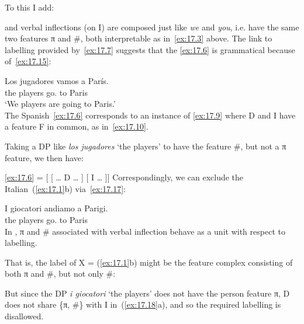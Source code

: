 \documentclass[output=paper]{langsci/langscibook}
\begin{document}
To this I add:

\ea\label{ex:17.14}
    \Fpl{} and \Spl{} verbal inflections (on I) are composed just like \emph{we}
    and \emph{you}, i.e. have the same two features π and \#, both interpretable
    as in~\eqref{ex:17.3} above.
\z
The link to labelling provided by~\eqref{ex:17.7} suggests that the 
\eqref{ex:17.6} is grammatical because of~\eqref{ex:17.15}:

\begin{exe}
\exi{\eqref{ex:17.6}}
    \gll    Los jugadores vamos a París.\\
            the players      go.\Fpl{} to Paris\\
    \glt    ‘We players are going to Paris.’\\
\ex\label{ex:17.15}
    The Spanish~\eqref{ex:17.6} corresponds to an instance of \eqref{ex:17.9}
    where D and I have a feature F in common, as in~\eqref{ex:17.10}.
\end{exe}
Taking a DP like \emph{los jugadores} ‘the players’ to have the feature \#, but
not a π feature, we then have:

\ea\label{ex:17.16}
    \eqref{ex:17.6} = [ [ \dots{} D\tss{\#} \dots{} ] [ I\tss{\#} \dots{} ]]
\z
Correspondingly, we can exclude the Italian~(\ref{ex:17.1}b)
via~\eqref{ex:17.17}:

\begin{exe}
    \gll I giocatori andiamo a Parigi.\\
    the players go.\Fpl{} to Paris\\
    \glt
\ex\label{ex:17.17}
    In , π and \# associated with verbal inflection behave as a unit
    with respect to labelling.
\end{exe}
That is, the label of X = (\ref{ex:17.1}b) might be the feature complex
consisting of both π and \#, but not only \#:

\ea\label{ex:17.18}
    \z
\z
But since the DP \emph{i giocatori} ‘the players’ does not have the person
feature π, D does not share \{π, \#\} with I in~(\ref{ex:17.18}a), and so the
required labelling is disallowed.
\end{document}
